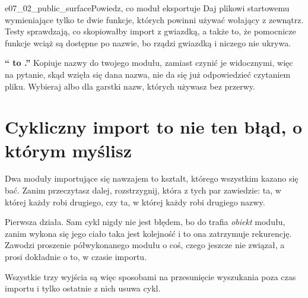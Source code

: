 \begin{exercise}{e07_02_public_surface}{Powiedz, co moduł eksportuje}
Daj plikowi startowemu  wymieniające tylko te dwie
funkcje, których powinni używać wołający z zewnątrz. Testy sprawdzają, co
skopiowałby import z gwiazdką, a także to, że pomocnicze funkcje wciąż są
dostępne po nazwie, bo  rządzi gwiazdką i niczego nie
ukrywa.
\end{exercise}

\begin{trapbox}
\textbf{\enquote{ to .}} Kopiuje nazwy
do twojego modułu, zamiast czynić je widocznymi, więc na pytanie, skąd
wzięła się dana nazwa, nie da się już odpowiedzieć czytaniem pliku. Wybieraj
 albo  dla garstki nazw, których
używasz bez przerwy.
\end{trapbox}

\section{Cykliczny import to nie ten błąd, o którym myślisz}
\label{sec:cycles}

Dwa moduły importujące się nawzajem to kształt, którego wszystkim kazano się
bać. Zanim przeczytasz dalej, rozstrzygnij, która z tych par zawiedzie: ta,
w której każdy robi  drugiego, czy ta, w której każdy robi
 drugiego  nazwy.

Pierwsza działa. Sam cykl nigdy nie jest błędem, bo do
 trafia \emph{obiekt} modułu, zanim wykona się jego ciało
\dash{} taka jest kolejność i to ona zatrzymuje rekurencję. Zawodzi proszenie
półwykonanego modułu o coś, czego jeszcze nie związał, a  prosi dokładnie o to, w czasie importu.




\noindent
Wszystkie trzy wyjścia są więc sposobami na przesunięcie wyszukania poza
czas importu i tylko ostatnie z nich usuwa cykl.

